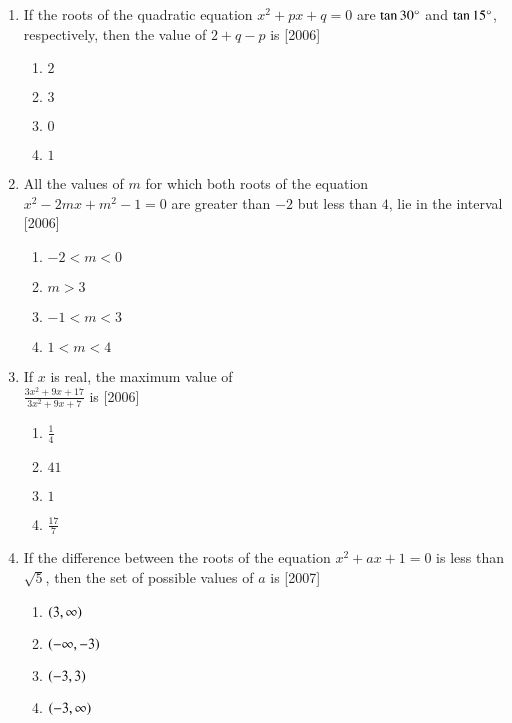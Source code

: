 \documentclass[journal,12pt,twocolumn]{IEEEtran}
\theoremstyle{remark}
\begin{document}
\begin{enumerate}
\item If the roots of the quadratic equation $x^2 + px + q = 0$ are $\tan 30\degree$ and $\tan 15\degree$, respectively, then the value of $2 + q - p$ is
\hfill[2006]

\begin{enumerate}


	\item  $2$
	\item  $3$
	\item  $0$
	\item  $1$
		
\end{enumerate}

\item All the values of $m$ for which both roots of the equation $x^2 - 2mx + m^2 - 1 = 0$ are greater than $-2$ but less than $4$, lie in the interval
\hfill[2006]

\begin{enumerate}

	\item  $-2 < m < 0$
	\item  $m > 3$
	\item  $-1 < m < 3$
	\item  $1 < m < 4$

\end{enumerate}

\item If $x$ is real, the maximum value of\\
$\frac{3x^2 + 9x + 17}{3x^2 + 9x + 7}$ is
\hfill[2006]

\begin{enumerate}

	\item  $\frac{1}{4}$
	\item  $41$
	\item  $1$
	\item  $\frac{17}{7}$

\end{enumerate}

\item If the difference between the roots of the equation $x^2 + ax + 1 = 0$ is less than $\sqrt{5}$, then the set of possible values of $a$ is
\hfill[2007]

\begin{enumerate}

	\item  $\left(3,\infty\right)$
	\item  $\left(-\infty, -3\right)$
	\item  $\left(-3, 3\right)$
	\item  $\left(-3, \infty\right)$


\end{enumerate}
\end{enumerate}
\end{document}

